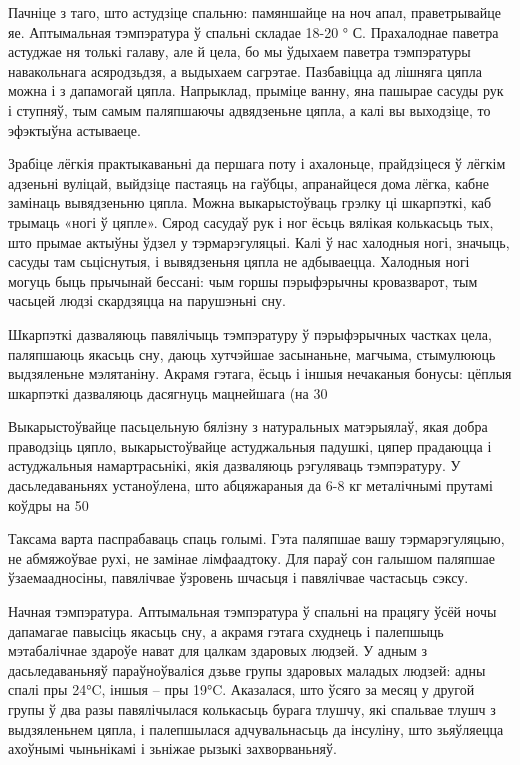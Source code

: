 Пачніце з таго, што астудзіце спальню: памяншайце на ноч апал, праветрывайце яе. Аптымальная тэмпэратура ў спальні складае 18-20 ° С. Прахалоднае паветра астуджае ня толькі галаву, але й цела, бо мы ўдыхаем паветра тэмпэратуры навакольнага асяродзьдзя, а выдыхаем сагрэтае. Пазбавіцца ад лішняга цяпла можна і з дапамогай цяпла. Напрыклад, прыміце ванну, яна пашырае сасуды рук і ступняў, тым самым паляпшаючы адвядзеньне цяпла, а калі вы выходзіце, то эфэктыўна астываеце.

Зрабіце лёгкія практыкаваньні да першага поту і ахалоньце, прайдзіцеся ў лёгкім адзеньні вуліцай, выйдзіце пастаяць на гаўбцы, апранайцеся дома лёгка, кабне замінаць вывядзеньню цяпла. Можна выкарыстоўваць грэлку ці шкарпэткі, каб трымаць «ногі ў цяпле». Сярод сасудаў рук і ног ёсьць вялікая колькасьць тых, што прымае актыўны ўдзел у тэрмарэгуляцыі. Калі ў нас халодныя ногі, значыць, сасуды там сьціснутыя, і вывядзеньня цяпла не адбываецца. Халодныя ногі могуць быць прычынай бессані: чым горшы пэрыфэрычны кровазварот, тым часьцей людзі скардзяцца на парушэньні сну.

Шкарпэткі дазваляюць павялічыць тэмпэратуру ў пэрыфэрычных частках цела, паляпшаюць якасьць сну, даюць хутчэйшае засынаньне, магчыма, стымулююць выдзяленьне мэлятаніну. Акрамя гэтага, ёсьць і іншыя нечаканыя бонусы: цёплыя шкарпэткі дазваляюць дасягнуць мацнейшага (на 30%

Выкарыстоўвайце пасьцельную бялізну з натуральных матэрыялаў, якая добра праводзіць цяпло, выкарыстоўвайце астуджальныя падушкі, цяпер прадаюцца і астуджальныя намартрасьнікі, якія дазваляюць рэгуляваць тэмпэратуру. У дасьледаваньнях устаноўлена, што абцяжараныя да 6-8 кг металічнымі прутамі коўдры на 50%

Таксама варта паспрабаваць спаць голымі. Гэта паляпшае вашу тэрмарэгуляцыю, не абмяжоўвае рухі, не замінае лімфаадтоку. Для параў сон галышом паляпшае ўзаемаадносіны, павялічвае ўзровень шчасьця і павялічвае частасьць сэксу.

Начная тэмпэратура. Аптымальная тэмпэратура ў спальні на працягу ўсёй ночы дапамагае павысіць якасьць сну, а акрамя гэтага схуднець і палепшыць мэтабалічнае здароўе нават для цалкам здаровых людзей. У адным з дасьледаваньняў параўноўваліся дзьве групы здаровых маладых людзей: адны спалі пры 24°C, іншыя – пры 19°C. Аказалася, што ўсяго за месяц у другой групы ў два разы павялічылася колькасьць бурага тлушчу, які спальвае тлушч з выдзяленьнем цяпла, і палепшылася адчувальнасьць да інсуліну, што зьяўляецца ахоўнымі чыньнікамі і зьніжае рызыкі захворваньняў.


